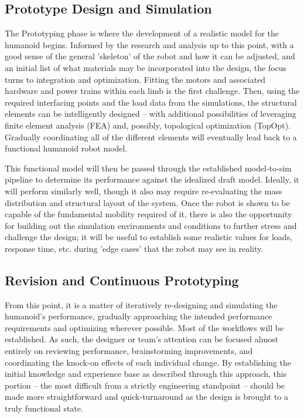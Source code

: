 \documentclass{article}
\begin{document}
\subsection{Prototype Design and Simulation}

The Prototyping phase is where the development of a realistic model for the humanoid begins. Informed by the research and analysis up to this point, with a good sense of the general 'skeleton' of the robot and how it can be adjusted, and an initial list of what materials may be incorporated into the design, the focus turns to integration and optimization. Fitting the motors and associated hardware and power trains within each limb is the first challenge. Then, using the required interfacing points and the load data from the simulations, the structural elements can be intelligently designed -- with additional possibilities of leveraging finite element analysis (FEA) and, possibly, topological optimization (TopOpt). Gradually coordinating all of the different elements will eventually lead back to a functional humanoid robot model.

This functional model will then be passed through the established model-to-sim pipeline to determine its performance against the idealized draft model. Ideally, it will perform similarly well, though it also may require re-evaluating the mass distribution and structural layout of the system. Once the robot is shown to be capable of the fundamental mobility required of it, there is also the opportunity for building out the simulation environments and conditions to further stress and challenge the design; it will be useful to establish some realistic values for loads, response time, etc. during 'edge cases' that the robot may see in reality. 

\subsection{Revision and Continuous Prototyping}

From this point, it is a matter of iteratively re-designing and simulating the humanoid's performance, gradually approaching the intended performance requirements and optimizing wherever possible. Most of the workflows will be established. As such, the designer or team's attention can be focused almost entirely on reviewing performance, brainstorming improvements, and coordinating the knock-on effects of each individual change. By establishing the initial knowledge and experience base as described through this approach, this portion -- the most difficult from a strictly engineering standpoint -- should be made more straightforward and quick-turnaround as the design is brought to a truly functional state.
\end{document}
